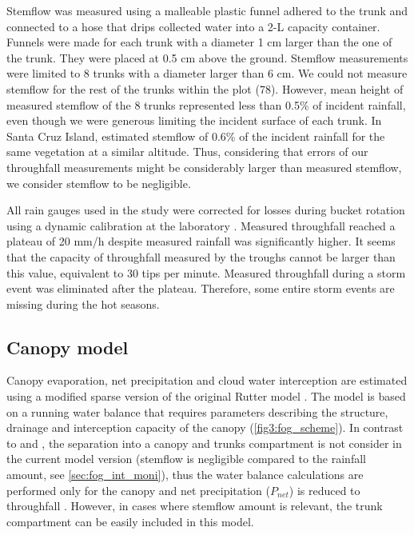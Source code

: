 \documentclass[a4paper,12pt]{article}
\begin{document}
\begin{linenumbers}
Stemflow was measured using a malleable plastic funnel adhered to the trunk and connected to a hose that drips collected water into a 2-L capacity container. Funnels were made for each trunk with a diameter 1 cm larger than the one of the trunk. They were placed at 0.5 cm above the ground. Stemflow measurements were limited to 8 trunks with a diameter larger than 6 cm. We could not measure stemflow for the rest of the trunks within the plot (78). However, mean height of measured stemflow of the 8 trunks represented less than 0.5\% of incident rainfall, even though we were generous limiting the incident surface of each trunk. In Santa Cruz Island, \cite{Pryetetal2012a} estimated stemflow of 0.6\% of the incident rainfall for the same vegetation at a similar altitude. Thus, considering that errors of our throughfall measurements might be considerably larger than measured stemflow, we consider stemflow to be negligible.

All rain gauges used in the study were corrected for losses during bucket rotation using a dynamic calibration at the laboratory \citep{CalderandKidd1978}. Measured throughfall reached a plateau of 20 mm/h despite measured rainfall was significantly higher. It seems that the capacity of throughfall measured by the troughs cannot be larger than this value, equivalent to 30 tips per minute. Measured throughfall during a storm event was eliminated after the plateau. Therefore, some entire storm events are missing during the hot seasons. 

\subsection{Canopy model}
Canopy evaporation, net precipitation and cloud water interception are estimated using a modified sparse version of the original Rutter model \citep{Rutter1971, Rutter1975}. The model is based on a running water balance that requires parameters describing the structure, drainage and interception capacity of the canopy (\autoref{fig3:fog_scheme}). In contrast to \cite{Rutter1975} and \cite{Valenteetal1997}, the separation into a canopy and trunks compartment is not consider in the current model version (stemflow is negligible compared to the rainfall amount, see \autoref{sec:fog_int_moni}), thus the water balance calculations are performed only for the canopy and net precipitation ($P_{net}$) is reduced to throughfall \citep{Pryetetal2012a}. However, in cases where stemflow amount is relevant, the trunk compartment can be easily included in this model.


\end{linenumbers}
\end{document}

